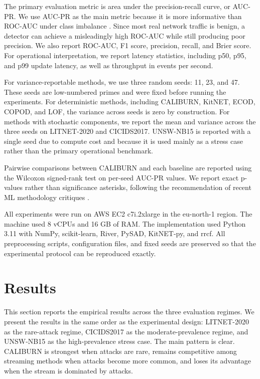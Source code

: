 \documentclass[preprint,12pt,authoryear]{elsarticle}
\newcommand{\caliburn}{CALIBURN}
\begin{document}
The primary evaluation metric is area under the precision-recall curve, or AUC-PR. We use AUC-PR as the main metric because it is more informative than ROC-AUC under class imbalance \citep{saito2015precision}. Since most real network traffic is benign, a detector can achieve a misleadingly high ROC-AUC while still producing poor precision. We also report ROC-AUC, F1 score, precision, recall, and Brier score. For operational interpretation, we report latency statistics, including p50, p95, and p99 update latency, as well as throughput in events per second.

For variance-reportable methods, we use three random seeds: 11, 23, and 47. These seeds are low-numbered primes and were fixed before running the experiments. For deterministic methods, including \caliburn{}, KitNET, ECOD, COPOD, and LOF, the variance across seeds is zero by construction. For methods with stochastic components, we report the mean and variance across the three seeds on LITNET-2020 and CICIDS2017. UNSW-NB15 is reported with a single seed due to compute cost and because it is used mainly as a stress case rather than the primary operational benchmark.

Pairwise comparisons between \caliburn{} and each baseline are reported using the Wilcoxon signed-rank test \citep{wilcoxon1945individual} on per-seed AUC-PR values. We report exact p-values rather than significance asterisks, following the recommendation of recent ML methodology critiques \citep{arp2022dosdonts}.

All experiments were run on AWS EC2 c7i.2xlarge in the eu-north-1 region. The machine used 8 vCPUs and 16 GB of RAM. The implementation used Python 3.11 with NumPy, scikit-learn, River, PySAD, KitNET-py, and rrcf. All preprocessing scripts, configuration files, and fixed seeds are preserved so that the experimental protocol can be reproduced exactly.

\section{Results}
\label{sec:results}

This section reports the empirical results across the three evaluation regimes. We present the results in the same order as the experimental design: LITNET-2020 as the rare-attack regime, CICIDS2017 as the moderate-prevalence regime, and UNSW-NB15 as the high-prevalence stress case. The main pattern is clear. \caliburn{} is strongest when attacks are rare, remains competitive among streaming methods when attacks become more common, and loses its advantage when the stream is dominated by attacks.
\end{document}
